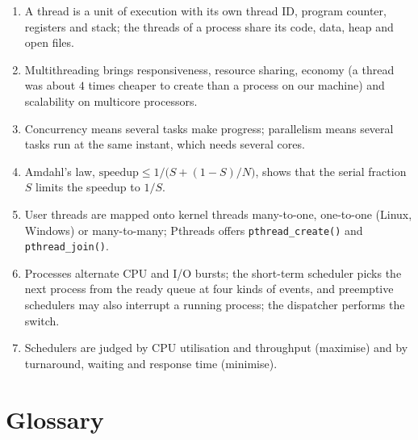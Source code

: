 \documentclass[11pt,a4paper]{article}
\newcommand{\cmd}[1]{\texttt{#1}}
\begin{document}
\begin{keyidea}
\begin{enumerate}[leftmargin=1.4em]
  \item A thread is a unit of execution with its own thread ID, program counter, registers and stack; the threads of a process share its code, data, heap and open files.
  \item Multithreading brings responsiveness, resource sharing, economy (a thread was about $4$ times cheaper to create than a process on our machine) and scalability on multicore processors.
  \item Concurrency means several tasks make progress; parallelism means several tasks run at the same instant, which needs several cores.
  \item Amdahl's law, $\text{speedup} \le 1/\bigl(S + (1-S)/N\bigr)$, shows that the serial fraction $S$ limits the speedup to $1/S$.
  \item User threads are mapped onto kernel threads many-to-one, one-to-one (Linux, Windows) or many-to-many; Pthreads offers \cmd{pthread\_create()} and \cmd{pthread\_join()}.
  \item Processes alternate CPU and I/O bursts; the short-term scheduler picks the next process from the ready queue at four kinds of events, and preemptive schedulers may also interrupt a running process; the dispatcher performs the switch.
  \item Schedulers are judged by CPU utilisation and throughput (maximise) and by turnaround, waiting and response time (minimise).
\end{enumerate}
\end{keyidea}

\section{Glossary}
\end{document}
